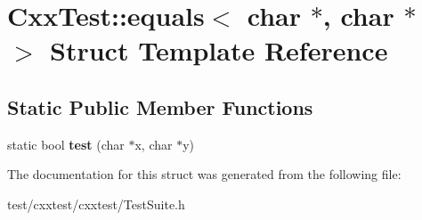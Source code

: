 \hypertarget{structCxxTest_1_1equals_3_01char_01_5_00_01char_01_5_01_4}{\section{Cxx\-Test\-:\-:equals$<$ char $\ast$, char $\ast$ $>$ Struct Template Reference}
\label{structCxxTest_1_1equals_3_01char_01_5_00_01char_01_5_01_4}
}
\subsection*{Static Public Member Functions}
\begin{DoxyCompactItemize}
\item 
\hypertarget{structCxxTest_1_1equals_3_01char_01_5_00_01char_01_5_01_4_abf9705e6047421967f889dfe5c8320d1}{static bool {\bfseries test} (char $\ast$x, char $\ast$y)}\label{structCxxTest_1_1equals_3_01char_01_5_00_01char_01_5_01_4_abf9705e6047421967f889dfe5c8320d1}

\end{DoxyCompactItemize}


The documentation for this struct was generated from the following file\-:\begin{DoxyCompactItemize}
\item 
test/cxxtest/cxxtest/Test\-Suite.\-h\end{DoxyCompactItemize}
